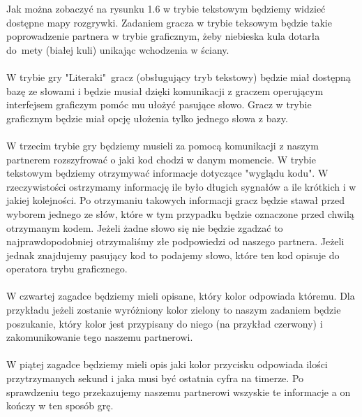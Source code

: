 \hspace{-0.60cm}Jak można zobaczyć na rysunku 1.6 w trybie tekstowym będziemy widzieć dostępne mapy rozgrywki. Zadaniem gracza w trybie teksowym będzie takie poprowadzenie partnera w trybie graficznym, żeby niebieska kula dotarła do~mety (białej kuli) unikając wchodzenia w ściany. 
\\
\\
W trybie gry "Literaki"~gracz (obsługujący tryb tekstowy) będzie miał dostępną bazę ze słowami i będzie musiał dzięki komunikacji z graczem operującym interfejsem graficzym pomóc mu ułożyć pasujące słowo. Gracz w trybie graficznym będzie miał opcję ułożenia tylko jednego słowa z bazy.
 \\
 \\
 W trzecim trybie gry będziemy musieli za pomocą komunikacji z naszym partnerem rozszyfrować o jaki kod chodzi w danym momencie. W trybie tekstowym będziemy otrzymywać informacje dotyczące "wyglądu kodu". W rzeczywistości ostrzymamy informację ile było długich sygnałów a ile krótkich i w jakiej kolejności. Po otrzymaniu takowych informacji gracz będzie stawał przed wyborem jednego ze słów, które w tym przypadku będzie oznaczone przed chwilą otrzymanym kodem. Jeżeli żadne słowo się nie będzie zgadzać to najprawdopodobniej otrzymaliśmy złe podpowiedzi od naszego partnera. Jeżeli jednak znajdujemy pasujący kod to podajemy słowo, które ten kod opisuje do operatora trybu graficznego. 
 \\
 \\
 W czwartej zagadce będziemy mieli opisane, który kolor odpowiada któremu. Dla przykładu jeżeli zostanie wyróżniony kolor zielony to naszym zadaniem będzie poszukanie, który kolor jest przypisany do niego (na przykład czerwony) i zakomunikowanie tego naszemu partnerowi.
 \\
 \\
 W piątej zagadce będziemy mieli opis jaki kolor przycisku odpowiada ilości przytrzymanych sekund i jaka musi być ostatnia cyfra na timerze. Po sprawdzeniu tego przekazujemy naszemu partnerowi wszyskie te informacje a on kończy w ten sposób grę.
 
 
 